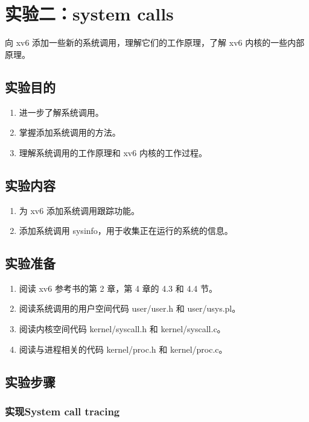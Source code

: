 \section{实验二：system calls}\label{sec:system calls}

向 xv6 添加一些新的系统调用，理解它们的工作原理，了解 xv6 内核的一些内部原理。

\subsection{实验目的}

\begin{enumerate}
	\item 进一步了解系统调用。
	\item 掌握添加系统调用的方法。
	\item 理解系统调用的工作原理和 xv6 内核的工作过程。
\end{enumerate}

\subsection{实验内容}

\begin{enumerate}
	\item 为 xv6 添加系统调用跟踪功能。
	\item 添加系统调用 sysinfo，用于收集正在运行的系统的信息。
\end{enumerate}

\subsection{实验准备}

\begin{enumerate}
	\item 阅读 xv6 参考书的第 2 章，第 4 章的 4.3 和 4.4 节。
	\item 阅读系统调用的用户空间代码 user/user.h 和 user/usys.pl。
	\item 阅读内核空间代码 kernel/syscall.h 和 kernel/syscall.c。
	\item 阅读与进程相关的代码 kernel/proc.h 和 kernel/proc.c。
\end{enumerate}

\subsection{实验步骤}

\subsubsection{实现System call tracing}

